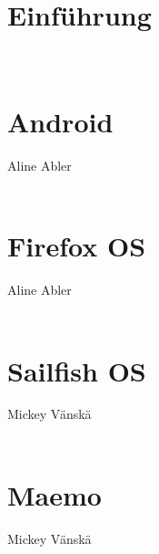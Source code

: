 \documentclass[a4paper,10pt,titlepage,twoside]{article}
\begin{document}
	
	\cleardoublepage
	
	\tableofcontents
	\cleardoublepage
	
	\pagestyle{fancyplain}
	\setcounter{page}{1}
	\newcommand{\HRule}{\rule{\linewidth}{0.5mm}}
	\fancyhead{}
	\fancyfoot{}
	\fancyfoot[RO,LE]{\thepage}
	\begin{multicols*}{2}

		\section{Einführung}
		{\normalsize \mbox{}}\\
		
		\pagebreak
		
		\section{Android}
		{\scriptsize Aline Abler}\\
		{\normalsize \mbox{}}\\
		
		\pagebreak
		
		\section{Firefox OS}
		{\scriptsize Aline Abler}\\
		{\normalsize \mbox{}}\\
		
		\pagebreak
		
		\section{Sailfish OS}
		{\scriptsize Mickey Vänskä}\\
		{\normalsize \mbox{}}\\
		
		\pagebreak
		
		\section{Maemo}
		{\scriptsize Mickey Vänskä}\\
		{\normalsize \mbox{}}\\
		
		\pagebreak
		

\end{multicols*}
\end{document}
